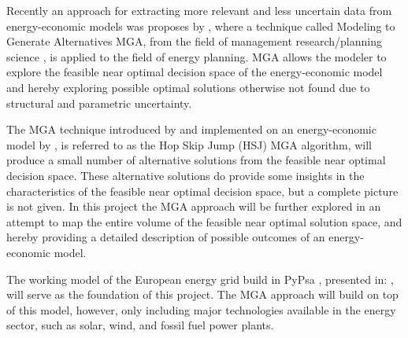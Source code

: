 Recently an approach for extracting more relevant and less uncertain data from energy-economic models was proposes by \citeauthor{DeCarolis_MGA}, where a technique called Modeling to Generate Alternatives MGA, from the field of management research/planning science \cite{Brill_MGA_1982}, is applied to the field of energy planning. MGA allows the modeler to explore the feasible near optimal decision space of the energy-economic model and hereby exploring possible optimal solutions otherwise not found due to structural and parametric uncertainty. 

The MGA technique introduced by \cite{Brill_MGA_1982} and implemented on an energy-economic model by \cite{DeCarolis_MGA}, is referred to as the Hop Skip Jump (HSJ) MGA algorithm, will produce a small number of alternative solutions from the feasible near optimal decision space.
These alternative solutions do provide some insights in the characteristics of the feasible near optimal decision space, but a complete picture is not given. 
In this project the MGA approach will be further explored in an attempt to map the entire volume of the feasible near optimal solution space, and hereby providing a detailed description of possible outcomes of an energy-economic model. 

The working model of the European energy grid build in PyPsa \cite{Pypsa}, presented in: \cite{PypsaModel}, will serve as the foundation of this project. The MGA approach will build on top of this model, however, only including major technologies available in the energy sector, such as solar, wind, and fossil fuel power plants.


\begin{comment}
- MGA \cite{Brill_MGA_1982}
- Feasible near optimal decision space 

Alternative solutions generated with energy-economy
optimization models also provide valuable insight that can be used to
challenge preconceptions and suggest creative alternatives to decision makers.
\end{comment}


